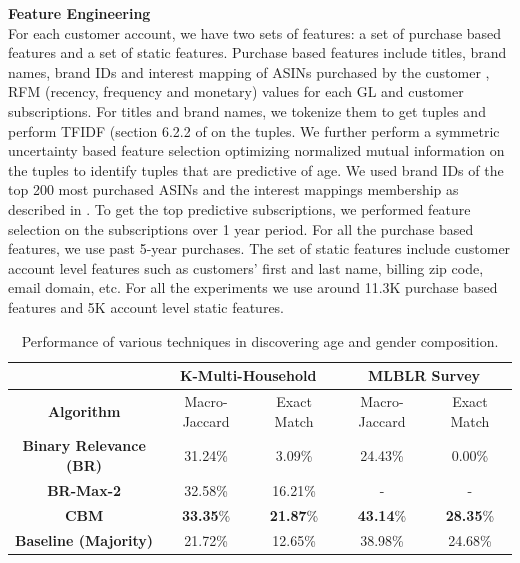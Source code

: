 \textbf{Feature Engineering}\\
For each customer account, we have two sets of features: a set of purchase based features and a set of static features. Purchase based features include titles, brand names, brand IDs and interest mapping of ASINs purchased by the customer \cite{sohoney2016interest}, RFM (recency, frequency and monetary) values for each GL and customer subscriptions. 
For titles and brand names, we tokenize them to get tuples and perform TFIDF (section 6.2.2 of \cite{christopher2008introduction} on the tuples. We further perform a symmetric uncertainty based feature selection optimizing normalized mutual information on the tuples to identify tuples that are predictive of age. We used brand IDs of the top 200 most purchased ASINs and the interest mappings membership as described in \cite{sohoney2016interest}. 
To get the top predictive subscriptions, we performed feature selection on the subscriptions over 1 year period. For all the purchase based features, we use past 5-year purchases.
%
The set of static features include customer account level features such as customers' first and last name, billing zip code, email domain, etc. 
For all the experiments we use around 11.3K purchase based features and 5K account level static features.
%
%
\begin{table}[]
\small
\setlength{\belowcaptionskip}{-10pt}
\centering
\begin{tabular}{|c|c|c|c|c|}
\hline
                                             & \multicolumn{2}{c|}{\textbf{K-Multi-Household}} & \multicolumn{2}{c|}{\textbf{MLBLR Survey}} \\ \hline
\textbf{Algorithm}                           & Macro-Jaccard          & Exact Match          & Macro-Jaccard         & Exact Match        \\ \hline
\textbf{Binary Relevance (BR)}               & 31.24\%                & 3.09\%               & 24.43\%               & 0.00\%             \\ \hline
\textbf{BR-Max-2}                            & 32.58\%                & 16.21\%              & -                     & -                  \\ \hline
\textbf{CBM}                                 & \textbf{33.35}\%                & \textbf{21.87}\%              & \textbf{43.14}\%               & \textbf{28.35}\%            \\ \hline
\textbf{Baseline (Majority)} & 21.72\%                & 12.65\%              & 38.98\%               & 24.68\%            \\ \hline
\end{tabular}
\caption{Performance of various techniques in discovering age and gender composition. }
\label{table:performance-age-gender}
\end{table}
